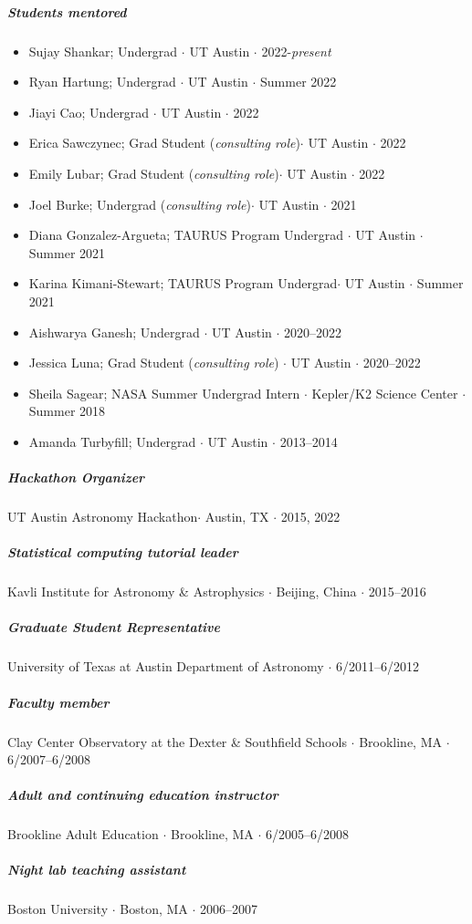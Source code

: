 \documentclass[10pt,letterpaper]{article}
\begin{document}
\subparagraph{Students mentored}
\begin{itemize}
    \item Sujay Shankar; Undergrad $\cdot$ UT Austin $\cdot$ 2022-\emph{present}
    \item Ryan Hartung; Undergrad $\cdot$ UT Austin $\cdot$ Summer 2022
    \item Jiayi Cao; Undergrad $\cdot$ UT Austin $\cdot$ 2022
    \item Erica Sawczynec; Grad Student (\emph{consulting role})$\cdot$ UT Austin $\cdot$ 2022
    \item Emily Lubar; Grad Student (\emph{consulting role})$\cdot$ UT Austin $\cdot$ 2022
    \item Joel Burke; Undergrad (\emph{consulting role})$\cdot$ UT Austin $\cdot$ 2021
    \item Diana Gonzalez-Argueta; TAURUS Program Undergrad $\cdot$ UT Austin $\cdot$ Summer 2021
    \item Karina Kimani-Stewart; TAURUS Program Undergrad$\cdot$ UT Austin $\cdot$ Summer 2021
    \item Aishwarya Ganesh; Undergrad $\cdot$ UT Austin $\cdot$  2020--2022
    \item Jessica Luna; Grad Student (\emph{consulting role}) $\cdot$ UT Austin $\cdot$  2020--2022
    \item Sheila Sagear; NASA Summer Undergrad Intern $\cdot$ Kepler/K2 Science Center $\cdot$ Summer 2018
    \item Amanda Turbyfill; Undergrad $\cdot$ UT Austin $\cdot$ 2013--2014
\end{itemize}


\subparagraph{Hackathon Organizer}
UT Austin Astronomy Hackathon$\cdot$ Austin, TX $\cdot$ 2015, 2022

\subparagraph{Statistical computing tutorial leader}
Kavli Institute for Astronomy \& Astrophysics $\cdot$ Beijing, China $\cdot$ 2015--2016

\subparagraph{Graduate Student Representative}
University of Texas at Austin Department of Astronomy $\cdot$ 6/2011--6/2012

\subparagraph{Faculty member}
Clay Center Observatory at the Dexter \& Southfield Schools  $\cdot$ Brookline, MA $\cdot$ 6/2007--6/2008

\subparagraph{Adult and continuing education instructor}
Brookline Adult Education  $\cdot$ Brookline, MA $\cdot$ 6/2005--6/2008

\subparagraph{Night lab teaching assistant}
Boston University $\cdot$ Boston, MA $\cdot$ 2006--2007
\end{document}
